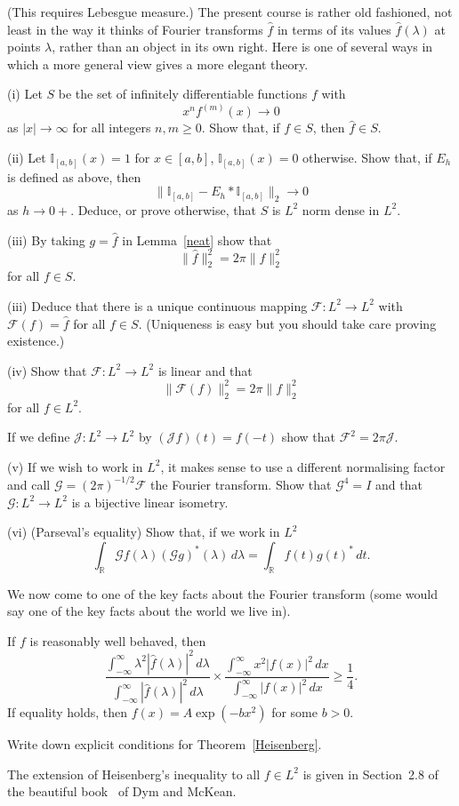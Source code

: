 \begin{exercise}\label{Hilbert dual}
(This requires Lebesgue measure.)
The present course is rather old fashioned, not least
in the way it thinks of Fourier transforms $\hat{f}$
in terms of its values $\hat{f}(\lambda)$ at points $\lambda$,
rather than an object in its own right. Here is one
of several ways in which a more general view gives a
more elegant theory.

(i) Let $S$ be the set of infinitely differentiable
functions $f$ with
\[x^{n}f^{(m)}(x)\rightarrow 0\]
as $|x|\rightarrow\infty$ for all integers $n,m\geq 0$.
Show that, if $f\in S$, then $\hat{f}\in S$.

(ii) Let ${\mathbb I}_{[a,b]}(x)=1$ for $x\in [a,b]$,
${\mathbb I}_{[a,b]}(x)=0$ otherwise.
Show that, if $E_{h}$ is defined as above, then
\[\|{\mathbb I}_{[a,b]}-E_{h}*{\mathbb I}_{[a,b]}\|_{2}
\rightarrow 0\]
as $h\rightarrow 0+$.
Deduce, or prove otherwise, that $S$ is $L^{2}$ norm dense
in $L^{2}$.

(iii)  By taking $g=\hat{f}$ in Lemma~\ref{neat} show that
\[\|\hat{f}\|_{2}^{2}=2\pi \|f\|_{2}^{2}\]
for all $f\in S$.

(iii) Deduce that there is a unique continuous mapping
${\mathcal F}:L^{2}\rightarrow L^{2}$ with ${\mathcal F}(f)=\hat{f}$
for all $f\in S$. (Uniqueness is easy  but you should take care
proving existence.)

(iv) Show that ${\mathcal F}:L^{2}\rightarrow L^{2}$ is linear
and that
\[\|{\mathcal F}(f)\|_{2}^{2}=2\pi \|f\|_{2}^{2}\]
for all $f\in L^{2}$.

If we define ${\mathcal J}:L^{2}\rightarrow L^{2}$ by
$({\mathcal J}f)(t)=f(-t)$ show that
${\mathcal F}^{2}=2\pi{\mathcal J}$.

(v) If we wish to work in $L^{2}$, it makes sense to use
a different normalising factor and call
${\mathcal G}=(2\pi)^{-1/2}{\mathcal F}$ the Fourier
transform. Show that ${\mathcal G}^{4}=I$ and that
${\mathcal G}:L^{2}\rightarrow L^{2}$ is a bijective linear
isometry.

(vi) (Parseval's equality) Show that, if we work in $L^{2}$
\[\int_{\mathbb R}
{\mathcal G}f(\lambda)({\mathcal G}g)^{*}(\lambda)
\,d\lambda=\int_{\mathbb R}f(t)g(t)^{*}\,dt.\]
\end{exercise}

We now come to one of the key facts about the Fourier
transform (some would say one of the key facts about
the world we live in).
\begin{theorem}\label{Heisenberg}
If $f$ is reasonably well behaved, then
\[
\frac
{\int_{-\infty}^{\infty}\lambda^{2}|\hat{f}(\lambda)|^{2}\,d\lambda}
{\int_{-\infty}^{\infty}|\hat{f}(\lambda)|^{2}\,d\lambda}
\times
\frac
{\int_{-\infty}^{\infty}x^{2}|f(x)|^{2}\,dx}
{\int_{-\infty}^{\infty}|f(x)|^{2}\,dx}
\geq \frac{1}{4}.
\]
If equality holds, then $f(x)=A\exp(-bx^{2})$ for some $b>0$.
\end{theorem}
\begin{exercise} Write down explicit conditions for
Theorem~\ref{Heisenberg}.
\end{exercise}
The extension of Heisenberg's inequality to all
$f\in L^{2}$ is given in Section~2.8 of the
beautiful book~\cite{Dym} of Dym and McKean.
